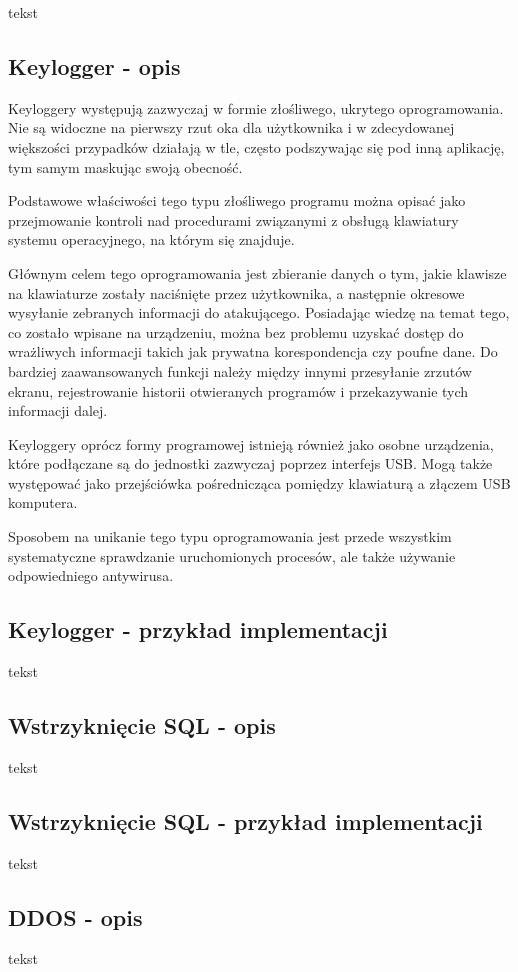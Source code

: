 \documentclass[12pt,twoside]{article}
\begin{document}
tekst 

\subsection{Keylogger - opis}

Keyloggery występują zazwyczaj w formie złośliwego, ukrytego oprogramowania. Nie są widoczne na pierwszy rzut oka dla użytkownika i w zdecydowanej większości przypadków działają w tle, często podszywając się pod inną aplikację, tym samym maskując swoją obecność. 

Podstawowe właściwości tego typu złośliwego programu można opisać jako przejmowanie kontroli nad procedurami związanymi z obsługą klawiatury systemu operacyjnego, na którym się znajduje.

Głównym celem tego oprogramowania jest zbieranie danych o tym, jakie klawisze na klawiaturze zostały naciśnięte przez użytkownika, a następnie okresowe wysyłanie zebranych informacji do atakującego. Posiadając wiedzę na temat tego, co zostało wpisane na urządzeniu, można bez problemu uzyskać dostęp do wrażliwych informacji takich jak prywatna korespondencja czy poufne dane. Do bardziej zaawansowanych funkcji należy między innymi przesyłanie zrzutów ekranu, rejestrowanie historii otwieranych programów i przekazywanie tych informacji dalej.

Keyloggery oprócz formy programowej istnieją również jako osobne urządzenia, które podłączane są do jednostki zazwyczaj poprzez interfejs USB. Mogą także występować jako przejściówka pośrednicząca pomiędzy klawiaturą a złączem USB komputera. 

Sposobem na unikanie tego typu oprogramowania jest przede wszystkim systematyczne sprawdzanie uruchomionych procesów, ale także używanie odpowiedniego antywirusa.

\subsection{Keylogger - przykład implementacji}
tekst
\subsection{Wstrzyknięcie SQL - opis}
tekst
\subsection{Wstrzyknięcie SQL - przykład implementacji}
tekst
\subsection{DDOS - opis}
tekst
\end{document}
